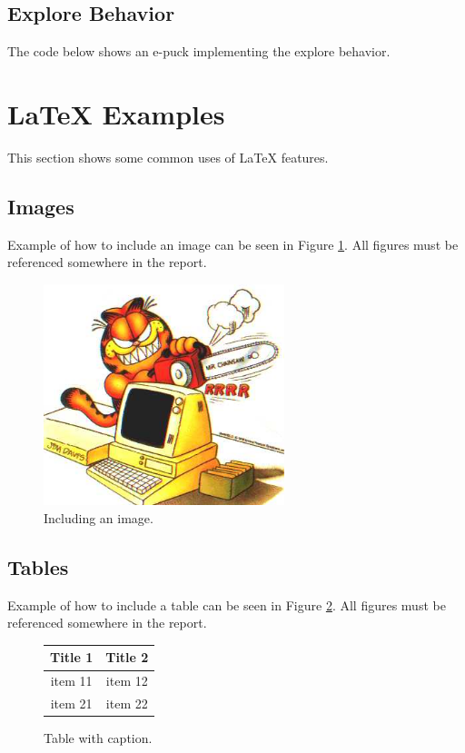 \documentclass[12pt,a4paper]{article}
\begin{document}
\subsection{Explore Behavior} \label{app:expl} %
The code below shows an e-puck implementing the explore behavior.


\section{\LaTeX{} Examples} %
This section shows some common uses of \LaTeX{} features.
\subsection{Images}
Example of how to include an image can be seen in Figure \ref{fig:graphicfile}. All figures must be referenced somewhere in the report.
\begin{figure}[htb]
\begin{center}
\includegraphics[width=7cm]{garfield}
\caption{Including an image.}
\label{fig:graphicfile} %
\end{center}
\end{figure}

\subsection{Tables}
Example of how to include a table can be seen in Figure \ref{fig:someTable}. All figures must be referenced somewhere in the report.
\begin{figure}[h]
\begin{center}
\begin{tabular}{|c|c|}
\hline
\textbf{Title 1} & \textbf{Title 2} \\
\hline
item 11	&	item 12	\\
\hline
item 21	&	item 22	\\
\hline
\end{tabular}
\end{center}
\caption{Table with caption.}
\label{fig:someTable}
\end{figure}
\end{document}
